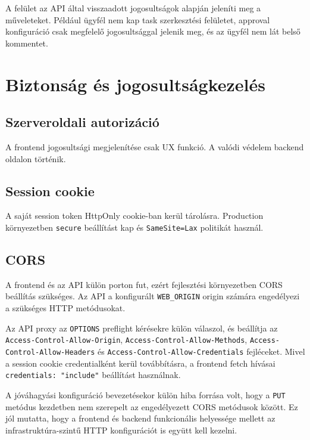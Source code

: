 \documentclass[11pt,a4paper]{report}
\begin{document}
    A felület az API által visszaadott jogosultságok alapján jeleníti meg a
    műveleteket. Például ügyfél nem kap task szerkesztési felületet, approval
    konfiguráció csak megfelelő jogosultsággal jelenik meg, és az ügyfél nem lát
    belső kommentet.

    \chapter{Biztonság és jogosultságkezelés}

    \section{Szerveroldali autorizáció}

    A frontend jogosultsági megjelenítése csak UX funkció. A valódi védelem
    backend oldalon történik.

    \section{Session cookie}

    A saját session token HttpOnly cookie-ban kerül tárolásra. Production
    környezetben \texttt{secure} beállítást kap és \texttt{SameSite=Lax}
    politikát használ.

    \section{CORS}

    A frontend és az API külön porton fut, ezért fejlesztési környezetben CORS
    beállítás szükséges. Az API a konfigurált \texttt{WEB\_ORIGIN} origin számára
    engedélyezi a szükséges HTTP metódusokat.

    Az API proxy az \texttt{OPTIONS} preflight kérésekre külön válaszol, és
    beállítja az \texttt{Access-Control-Allow-Origin},
    \texttt{Access-Control-Allow-Methods},
    \texttt{Access-Control-Allow-Headers} és
    \texttt{Access-Control-Allow-Credentials} fejléceket. Mivel a session cookie
    credentialként kerül továbbításra, a frontend fetch hívásai
    \texttt{credentials: "include"} beállítást használnak.

    A jóváhagyási konfiguráció bevezetésekor külön hiba forrása volt, hogy a
    \texttt{PUT} metódus kezdetben nem szerepelt az engedélyezett CORS metódusok
    között. Ez jól mutatta, hogy a frontend és backend funkcionális helyessége
    mellett az infrastruktúra-szintű HTTP konfigurációt is együtt kell kezelni.
\end{document}
